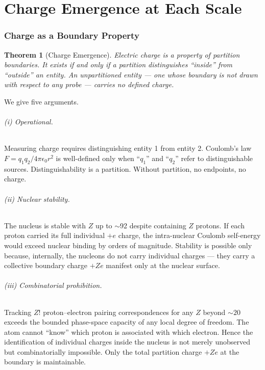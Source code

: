 \documentclass[11pt,a4paper]{article}
\newtheorem{theorem}{Theorem}[section]
\theoremstyle{definition}
\theoremstyle{remark}
\begin{document}
\part{Charge Emergence at Each Scale}

\section{Charge as a Boundary Property}
\label{sec:charge}

\begin{theorem}[Charge Emergence]
\label{thm:charge}
Electric charge is a property of partition boundaries. It exists if and only if a partition distinguishes ``inside'' from ``outside'' an entity. An unpartitioned entity --- one whose boundary is not drawn with respect to any probe --- carries no defined charge.
\end{theorem}

We give five arguments.

\paragraph{(i) Operational.} Measuring charge requires distinguishing entity 1 from entity 2. Coulomb's law $F = q_1 q_2/4\pi\epsilon_0 r^2$ is well-defined only when ``$q_1$'' and ``$q_2$'' refer to distinguishable sources. Distinguishability is a partition. Without partition, no endpoints, no charge.

\paragraph{(ii) Nuclear stability.} The nucleus is stable with $Z$ up to $\sim$92 despite containing $Z$ protons. If each proton carried its full individual $+e$ charge, the intra-nuclear Coulomb self-energy would exceed nuclear binding by orders of magnitude. Stability is possible only because, internally, the nucleons do not carry individual charges --- they carry a collective boundary charge $+Ze$ manifest only at the nuclear surface.

\paragraph{(iii) Combinatorial prohibition.} Tracking $Z!$ proton--electron pairing correspondences for any $Z$ beyond $\sim 20$ exceeds the bounded phase-space capacity of any local degree of freedom. The atom cannot ``know'' which proton is associated with which electron. Hence the identification of individual charges inside the nucleus is not merely unobserved but combinatorially impossible. Only the total partition charge $+Ze$ at the boundary is maintainable.
\end{document}

